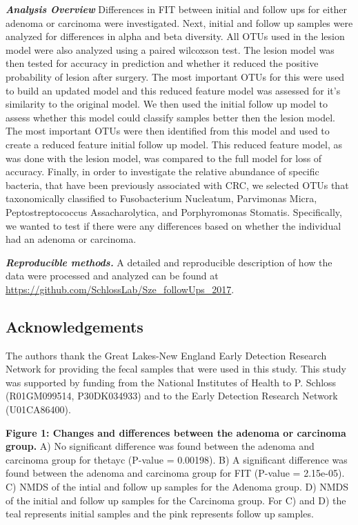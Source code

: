 \documentclass[12pt,]{article}
\begin{document}
\textbf{\emph{Analysis Overview}} Differences in FIT between initial and
follow ups for either adenoma or carcinoma were investigated. Next,
initial and follow up samples were analyzed for differences in alpha and
beta diversity. All OTUs used in the lesion model were also analyzed
using a paired wilcoxson test. The lesion model was then tested for
accuracy in prediction and whether it reduced the positive probability
of lesion after surgery. The most important OTUs for this were used to
build an updated model and this reduced feature model was assessed for
it's similarity to the original model. We then used the initial follow
up model to assess whether this model could classify samples better then
the lesion model. The most important OTUs were then identified from this
model and used to create a reduced feature initial follow up model. This
reduced feature model, as was done with the lesion model, was compared
to the full model for loss of accuracy. Finally, in order to investigate
the relative abundance of specific bacteria, that have been previously
associated with CRC, we selected OTUs that taxonomically classified to
Fusobacterium Nucleatum, Parvimonas Micra, Peptostreptococcus
Assacharolytica, and Porphyromonas Stomatis. Specifically, we wanted to
test if there were any differences based on whether the individual had
an adenoma or carcinoma.

\textbf{\emph{Reproducible methods.}} A detailed and reproducible
description of how the data were processed and analyzed can be found at
\url{https://github.com/SchlossLab/Sze_followUps_2017}.

\newpage

\subsection{Acknowledgements}\label{acknowledgements}

The authors thank the Great Lakes-New England Early Detection Research
Network for providing the fecal samples that were used in this study.
This study was supported by funding from the National Institutes of
Health to P. Schloss (R01GM099514, P30DK034933) and to the Early
Detection Research Network (U01CA86400).

\newpage

\textbf{Figure 1: Changes and differences between the adenoma or
carcinoma group.} A) No significant difference was found between the
adenoma and carcinoma group for thetayc (P-value = 0.00198). B) A
significant difference was found between the adenoma and carcinoma group
for FIT (P-value = 2.15e-05). C) NMDS of the intial and follow up
samples for the Adenoma group. D) NMDS of the initial and follow up
samples for the Carcinoma group. For C) and D) the teal represents
initial samples and the pink represents follow up samples.
\end{document}
